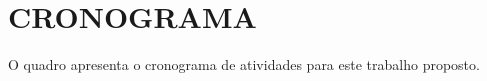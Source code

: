 
\chapter{CRONOGRAMA}
\label{sec:cronograma}

O quadro \cite{qua:quadro-cronograma} apresenta o cronograma de atividades para este trabalho proposto.

